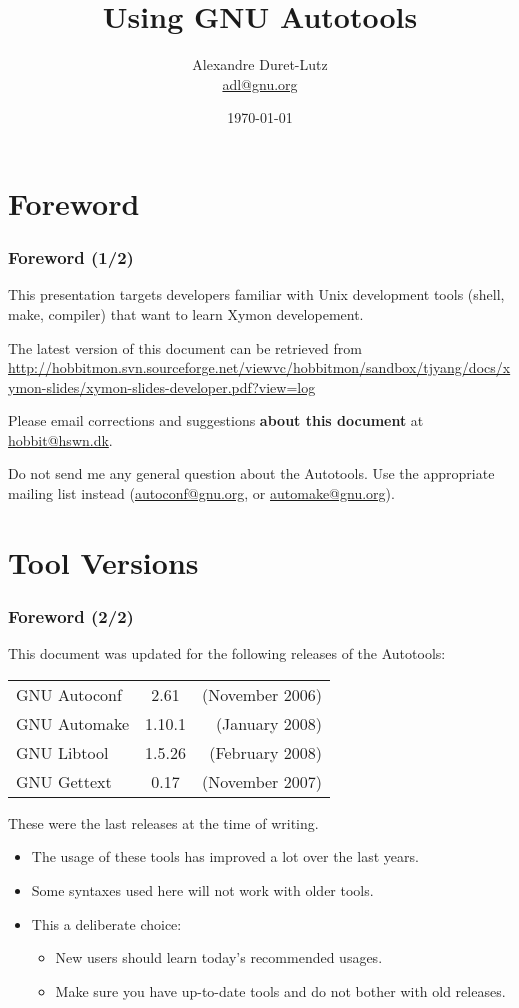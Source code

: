 \documentclass{beamer}
\title{Using GNU Autotools}
\author[A. Duret-Lutz]{Alexandre Duret-Lutz\\\url{adl@gnu.org}}
\date{\today}
\begin{document}
\section*{Foreword}
\begin{frame}
\frametitle{Foreword (1/2)}

This presentation targets developers familiar with Unix development
tools (shell, make, compiler) that want to learn Xymon developement.

\bigskip

The latest version of this document can be retrieved from\\
{\small \url{http://hobbitmon.svn.sourceforge.net/viewvc/hobbitmon/sandbox/tjyang/docs/xymon-slides/xymon-slides-developer.pdf?view=log}}

\bigskip

Please email corrections and suggestions \textbf{about this
  document} at \url{hobbit@hswn.dk}.

\medskip

Do not send me any general question about the Autotools.  Use the
appropriate mailing list instead (\url{autoconf@gnu.org}, or
\url{automake@gnu.org}).

\end{frame}

\section*{Tool Versions}
\begin{frame}
\frametitle{Foreword (2/2)}

This document was updated for the following releases of the
Autotools:

\gdef\gettextver{0.17}
\gdef\automakever{1.10.1}
\gdef\autoconfver{2.61}
\begin{center}
\begin{tabular}{lcr}
GNU Autoconf & \autoconfver & (November 2006) \\
GNU Automake & \automakever & (January 2008) \\
GNU Libtool  & 1.5.26       & (February 2008) \\
GNU Gettext  & \gettextver  & (November 2007) \\
\end{tabular}
\end{center}

These were the last releases at the time of writing.

\begin{itemize}
\item The usage of these tools has improved a lot over
  the last years.
\item Some syntaxes used here will not work with older tools.
\item This a deliberate choice:
\begin{itemize}
\item New users should learn today's recommended usages.
\item Make sure you have up-to-date tools and do not bother with old releases.
\end{itemize}
\end{itemize}

\end{frame}
\end{document}
